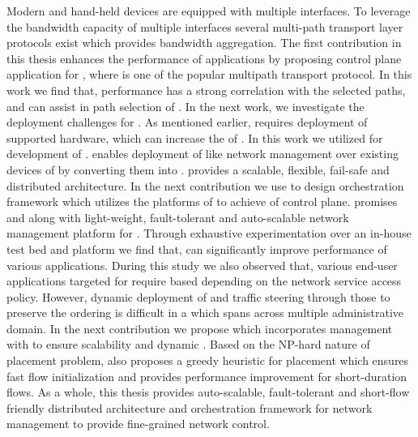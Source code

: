 Modern  and hand-held devices are equipped with multiple interfaces. To leverage the bandwidth capacity of multiple interfaces several multi-path transport layer protocols exist which provides bandwidth aggregation. The first contribution in this thesis enhances the performance of  applications by proposing  control plane application  for , where  is one of the popular multipath transport protocol. In this work we find that,  performance has a strong correlation with the selected paths, and  can assist in path selection of . In the next work, we investigate the  deployment challenges for . As mentioned earlier,  requires deployment of  supported hardware, which can increase the  of . In this work we utilized  for development of .  enables deployment of  like network management over existing  devices of  by converting them into .  provides a scalable, flexible, fail-safe and distributed  architecture. In the next contribution we use  to design  orchestration framework which utilizes the  platforms of  to achieve  of  control plane.  promises  and  along with light-weight, fault-tolerant and auto-scalable network management platform for . Through exhaustive experimentation over an in-house test bed and  platform we find that,  can significantly improve performance of various  applications. During this study we also observed that, various end-user applications targeted for  require  based  depending on the network service access policy. However, dynamic deployment of  and traffic steering through those  to preserve the  ordering is difficult in a  which spans across multiple administrative domain. In the next contribution we propose  which incorporates  management with  to ensure scalability and dynamic . Based on the NP-hard nature of  placement problem,  also proposes a greedy heuristic for  placement which ensures fast flow initialization and provides performance improvement for short-duration flows. As a whole, this thesis provides auto-scalable, fault-tolerant and short-flow friendly distributed architecture and orchestration framework for  network management to provide fine-grained network control.